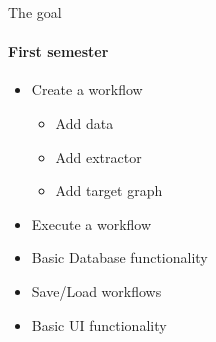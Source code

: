 \begin{frame}{The goal}
\framesubtitle{First semester}
	\begin{itemize}
		\item Create a workflow
		\begin{itemize}
			\item Add data
			\item Add extractor
			\item Add target graph
		\end{itemize}
		\item Execute a workflow
		\item Basic Database functionality
		\item Save/Load workflows
		\item Basic UI functionality
	\end{itemize}
\end{frame}
